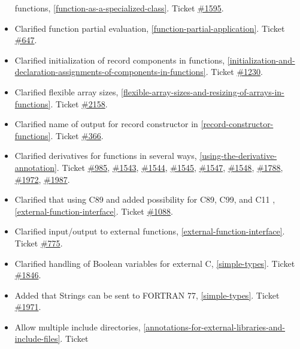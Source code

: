 \documentclass[10pt,a4paper]{report}
\begin{document}
\begin{itemize}
  functions, \ref{function-as-a-specialized-class}. Ticket
  \href{https://trac.modelica.org/Modelica/ticket/1595}{\#1595}.
\item
  Clarified function partial evaluation, \ref{function-partial-application}. Ticket
  \href{https://trac.modelica.org/Modelica/ticket/647}{\#647}.
\item
  Clarified initialization of record components in functions, 
  \ref{initialization-and-declaration-assignments-of-components-in-functions}. Ticket
  \href{https://trac.modelica.org/Modelica/ticket/1230}{\#1230}.
\item
  Clarified flexible array sizes, \ref{flexible-array-sizes-and-resizing-of-arrays-in-functions}. Ticket
  \href{https://trac.modelica.org/Modelica/ticket/2158}{\#2158}.
\item
  Clarified name of output for record constructor in \ref{record-constructor-functions}.
  Ticket \href{https://trac.modelica.org/Modelica/ticket/366}{\#366}.
\item
  Clarified derivatives for functions in several ways, \ref{using-the-derivative-annotation}.
  Ticket \href{https://trac.modelica.org/Modelica/ticket/985}{\#985},
  \href{https://trac.modelica.org/Modelica/ticket/1543}{\#1543},
  \href{https://trac.modelica.org/Modelica/ticket/1544}{\#1544},
  \href{https://trac.modelica.org/Modelica/ticket/1545}{\#1545},
  \href{https://trac.modelica.org/Modelica/ticket/1547}{\#1547},
  \href{https://trac.modelica.org/Modelica/ticket/1548}{\#1548},
  \href{https://trac.modelica.org/Modelica/ticket/1788}{\#1788},
  \href{https://trac.modelica.org/Modelica/ticket/1972}{\#1972},
  \href{https://trac.modelica.org/Modelica/ticket/1987}{\#1987}.
\item
  Clarified that using C89 and added possibility for C89, C99, and C11 ,
  \ref{external-function-interface}. Ticket
  \href{https://trac.modelica.org/Modelica/ticket/1088}{\#1088}.
\item
  Clarified input/output to external functions, \ref{external-function-interface}. Ticket
  \href{https://trac.modelica.org/Modelica/ticket/775}{\#775}.
\item
  Clarified handling of Boolean variables for external C, 
  \ref{simple-types}. Ticket
  \href{https://trac.modelica.org/Modelica/ticket/1846}{\#1846}.
\item
  Added that Strings can be sent to FORTRAN 77, \ref{simple-types}. Ticket
  \href{https://trac.modelica.org/Modelica/ticket/1971}{\#1971}.
\item
  Allow multiple include directories, \ref{annotations-for-external-libraries-and-include-files}. Ticket

\end{itemize}
\end{document}
